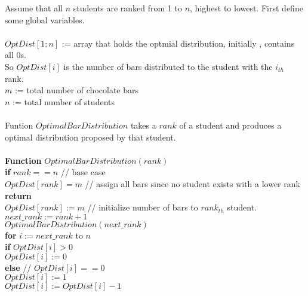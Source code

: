\documentclass[11pt]{article}
\begin{document}
Assume that all $n$ students are ranked from 1 to $n$, highest to
lowest. First define some global variables.\\\\ 
$OptDist[1:n]$ := array that holds the optmial distribution, initially
, contains all 0s.\\
So $OptDist[i]$ is the number of bars distributed to the student with
the $i_{th}$ rank.\\
$m$ := total number of chocolate bars\\
$n$ := total number of students\\\\
Funtion $OptimalBarDistribution$ takes a $rank$ of a student
and produces a optimal distribution proposed by that student.\\\\
\textbf{Function} $OptimalBarDistribution( rank )$\\
\-\hspace{2em} \textbf{if} $rank == n$ // base case \\
\-\hspace{4em} $OptDist[rank] = m$ // assign all bars since no student
exists with a lower rank \\
\-\hspace{4em} \textbf{return}\\
\-\hspace{2em} $OptDist[rank] := m$ // initialize number of bars to
$rank_{th}$ student.\\
\-\hspace{2em} $next\_rank := rank+1$\\
\-\hspace{2em} $OptimalBarDistribution( next\_rank )$\\
\-\hspace{2em} \textbf{for} $i := next\_rank$ to $n$\\
\-\hspace{4em} \textbf{if} $OptDist[i] > 0$\\
\-\hspace{6em} $OptDist[i] := 0$\\
\-\hspace{4em} \textbf{else} // $OptDist[i] == 0$\\
\-\hspace{6em} $OptDist[i] := 1$\\
\-\hspace{6em} $OptDist[i] := OptDist[i] - 1$\\
\end{document}
